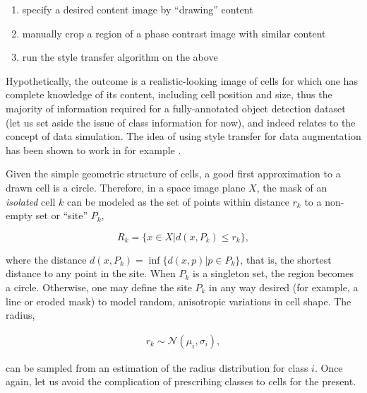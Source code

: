 \begin{enumerate}
\item specify a desired content image by ``drawing'' content
\item manually crop a region of a phase contrast image with similar content
\item run the style transfer algorithm on the above
\end{enumerate}

Hypothetically, the outcome is a realistic-looking image of cells for which one has complete knowledge of its content, including cell position and size, thus the majority of information required for a fully-annotated object detection dataset (let us set aside the issue of class information for now), and indeed relates to the concept of data simulation. The idea of using style transfer for data augmentation has been shown to work in for example \cite{zheng2019stada}.

Given the simple geometric structure of cells, a good first approximation to a drawn cell is a circle. Therefore, in a space image plane $X$, the mask of an \emph{isolated} cell $k$ can be modeled as the set of points within distance $r_k$ to a non-empty set or ``site'' $P_k$,

\begin{equation}
R_k = \{x \in X | d(x, P_k) \leq r_k\},
\label{eq:region}
\end{equation}

where the distance $d(x, P_k) = \inf\{d(x, p) | p \in P_k\}$, that is, the shortest distance to any point in the site. When $P_k$ is a singleton set, the region becomes a circle. Otherwise, one may define the site $P_k$ in any way desired (for example, a line or eroded mask) to model random, anisotropic variations in cell shape. The radius,

\begin{align}
r_k \sim \mathcal{N}(\mu_i, \sigma_i),
\label{eq:radius_dist}
\end{align}

can be sampled from an estimation of the radius distribution for class $i$. Once again, let us avoid the complication of prescribing classes to cells for the present.

